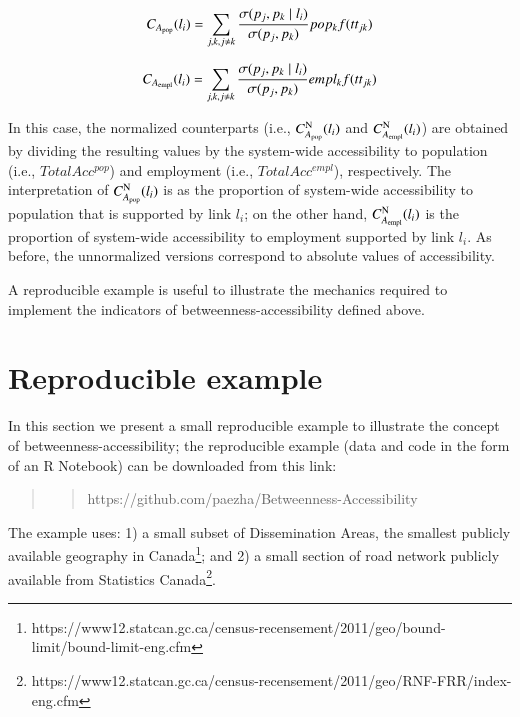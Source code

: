 \documentclass[]{elsarticle} %
\begin{document}
\begin{equation}\label{f:btw_acc_pop}
C_{A_{\rm pop}}(l_i)  =\sum_{j,k,j\neq k} \frac{{\sigma(p_j,p_k \mid l_i)}}{\sigma(p_j,p_k)} {{pop_k}{f(tt_{jk})}}%
\end{equation}

\begin{equation}\label{f:btw_empl_pop}
C_{A_{\rm empl}}(l_i)  =\sum_{j,k,j\neq k} \frac{{\sigma(p_j,p_k \mid l_i)}}{\sigma(p_j,p_k)} empl_kf(tt_{jk})%
\end{equation}

In this case, the normalized counterparts (i.e.,
\(C_{A_{\rm pop}}^{\rm N}(l_i)\) and \(C_{A_{\rm empl}}^{\rm N}(l_i)\))
are obtained by dividing the resulting values by the system-wide
accessibility to population (i.e., \(TotalAcc^{pop}\)) and employment
(i.e., \(TotalAcc^{empl}\)), respectively. The interpretation of
\(C_{A_{\rm pop}}^{\rm N}(l_i)\) is as the proportion of system-wide
accessibility to population that is supported by link \(l_i\); on the
other hand, \(C_{A_{\rm empl}}^{\rm N}(l_i)\) is the proportion of
system-wide accessibility to employment supported by link \(l_i\). As
before, the unnormalized versions correspond to absolute values of
accessibility.

A reproducible example is useful to illustrate the mechanics required to
implement the indicators of betweenness-accessibility defined above.

\hypertarget{reproducible-example}{%
\section{Reproducible example}\label{reproducible-example}}

In this section we present a small reproducible example to illustrate
the concept of betweenness-accessibility; the reproducible example (data
and code in the form of an R Notebook) can be downloaded from this link:

\begin{quote}
\begin{quote}
https://github.com/paezha/Betweenness-Accessibility
\end{quote}
\end{quote}

The example uses: 1) a small subset of Dissemination Areas, the smallest
publicly available geography in Canada\footnote{https://www12.statcan.gc.ca/census-recensement/2011/geo/bound-limit/bound-limit-eng.cfm};
and 2) a small section of road network publicly available from
Statistics Canada\footnote{https://www12.statcan.gc.ca/census-recensement/2011/geo/RNF-FRR/index-eng.cfm}.
\end{document}
